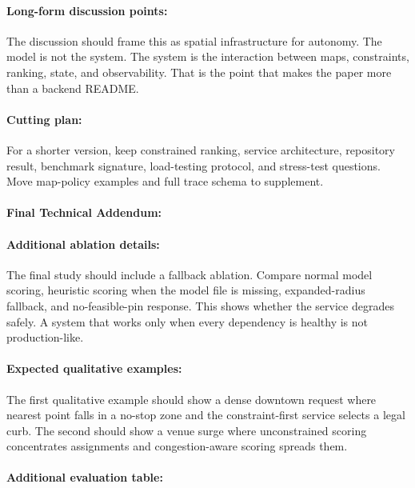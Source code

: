\documentclass{article}
\begin{document}
\paragraph{Long-form discussion points:}

The discussion should frame this as spatial infrastructure for autonomy. The model is not the system. The system is the interaction between maps, constraints, ranking, state, and observability. That is the point that makes the paper more than a backend README.

\paragraph{Cutting plan:}

For a shorter version, keep constrained ranking, service architecture, repository result, benchmark signature, load-testing protocol, and stress-test questions. Move map-policy examples and full trace schema to supplement.

\paragraph{Final Technical Addendum:}

\paragraph{Additional ablation details:}

The final study should include a fallback ablation. Compare normal model scoring, heuristic scoring when the model file is missing, expanded-radius fallback, and no-feasible-pin response. This shows whether the service degrades safely. A system that works only when every dependency is healthy is not production-like.

\paragraph{Expected qualitative examples:}

The first qualitative example should show a dense downtown request where nearest point falls in a no-stop zone and the constraint-first service selects a legal curb. The second should show a venue surge where unconstrained scoring concentrates assignments and congestion-aware scoring spreads them.

\paragraph{Additional evaluation table:}
\end{document}

